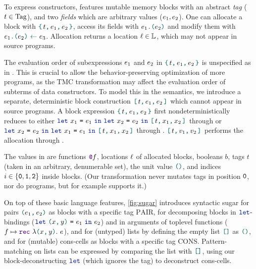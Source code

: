 To express constructors, \DataLang features mutable memory blocks with an abstract \emph{tag} ($\datalangTag \in \datalangTag[]$), and two \emph{fields} which are arbitrary values ($\datalangExpr_1, \datalangExpr_2$).
One can allocate a block with $\datalangBlock{\datalangTag}{\datalangExpr_1}{\datalangExpr_2}$, access its fields with $\datalangLoad{\datalangExpr_1}{\datalangExpr_2}$ and modify them with $\datalangStore{\datalangExpr_1}{\datalangExpr_2}{\datalangExpr_3}$.
Allocation returns a location $\datalangLoc \in \datalangLoc[]$, which may not appear in source programs.

The evaluation order of subexpressions $\datalangExpr_1$ and $\datalangExpr_2$ in $\datalangBlock{\datalangTag}{\datalangExpr_1}{\datalangExpr_2}$ is unspecified as in \OCaml.
This is crucial to allow the behavior-preserving optimization of more programs, as the TMC transformation may affect the evaluation order of subterms of data constructors.
To model this in the semantics, we introduce a separate, deterministic block construction $\datalangBlockDet{\datalangTag}{\datalangExpr_1}{\datalangExpr_2}$ which cannot appear in source programs. A block expression $\datalangBlock{\datalangTag}{\datalangExpr_1}{\datalangExpr_2}$ first nondeterministically reduces to either $\datalangLet{\datalangVar_1}{\datalangExpr_1}{\datalangLet{\datalangVar_2}{\datalangExpr_2}{\datalangBlockDet{\datalangTag}{\datalangVar_1}{\datalangVar_2}}}$ through  or $\datalangLet{\datalangVar_2}{\datalangExpr_2}{\datalangLet{\datalangVar_1}{\datalangExpr_1}{\datalangBlockDet{\datalangTag}{\datalangVar_1}{\datalangVar_2}}}$ through . $\datalangBlockDet{\datalangTag}{\datalangVal_1}{\datalangVal_2}$ performs the allocation through .

The values in \DataLang are functions $\datalangFnptr{\datalangFn}$, locations $\datalangLoc$ of allocated blocks, booleans $b$, tags $t$ (taken in an arbitrary, denumerable set), the unit value $\datalangUnit$, and indices $i \in \{\texttt{0}, \texttt{1}, \texttt{2}\}$ inside blocks. (Our transformation never mutates tags in position $\texttt{0}$, nor do \OCaml programs, but for example \Mezzo supports it.)

On top of these basic language features, \cref{fig:sugar} introduces syntactic sugar for pairs $\datalangPair {\datalangExpr_1} {\datalangExpr_2}$ as blocks with a specific tag $\mathrm{PAIR}$, for decomposing blocks in $\term{\color{datalangKeyword1}{let}}$-bindings ($\datalangLet {\datalangPair \datalangVar \datalangVarTwo} {\datalangExpr_1} {\datalangExpr_2}$) and in arguments of toplevel functions ($\datalangFn \mapsto \datalangRec {\datalangPair \datalangVar \datalangVarTwo} \datalangExpr$), and for (untyped) lists by defining the empty list $\datalangNil$ as $\datalangUnit$, and for (mutable) cons-cells as blocks with a specific tag $\mathrm{CONS}$. Pattern-matching on lists can be expressed by comparing the list with $\datalangNil$, using our block-deconstructing $\term{\color{datalangKeyword1}{let}}$ (which ignores the tag) to deconstruct cons-cells.

